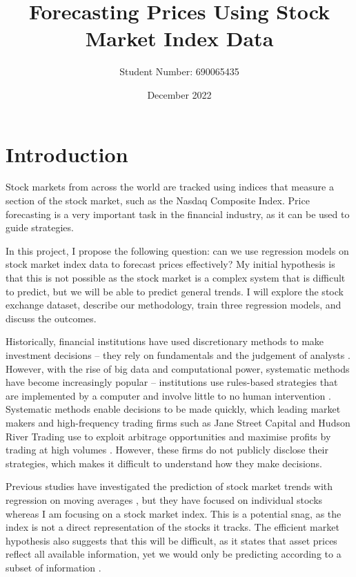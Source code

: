 \documentclass[a4paper, 11pt]{article}
\begin{document}
\title{Forecasting Prices Using Stock Market Index Data}
\author{Student Number: 690065435}
\date{December 2022}
\maketitle

\section{Introduction}
Stock markets from across the world are tracked using indices that measure a section of the stock market, such as the Nasdaq Composite Index. Price forecasting is a very important task in the financial industry, as it can be used to guide strategies.

In this project, I propose the following question: can we use regression models on stock market index data to forecast prices effectively? My initial hypothesis is that this is not possible as the stock market is a complex system that is difficult to predict, but we will be able to predict general trends. I will explore the stock exchange dataset, describe our methodology, train three regression models, and discuss the outcomes.

Historically, financial institutions have used discretionary methods to make investment decisions -- they rely on fundamentals and the judgement of analysts \cite{harvey2017man}. However, with the rise of big data and computational power, systematic methods have become increasingly popular -- institutions use rules-based strategies that are implemented by a computer and involve little to no human intervention \cite{harvey2017man}. Systematic methods enable decisions to be made quickly, which leading market makers and high-frequency trading firms such as Jane Street Capital and Hudson River Trading use to exploit arbitrage opportunities and maximise profits by trading at high volumes \cite{aldridge2013high}. However, these firms do not publicly disclose their strategies, which makes it difficult to understand how they make decisions.

Previous studies have investigated the prediction of stock market trends with regression on moving averages \cite{dinesh2021prediction}, but they have focused on individual stocks whereas I am focusing on a stock market index. This is a potential snag, as the index is not a direct representation of the stocks it tracks. The efficient market hypothesis also suggests that this will be difficult, as it states that asset prices reflect all available information, yet we would only be predicting according to a subset of information \cite{fama1970efficient}. 
\end{document}
